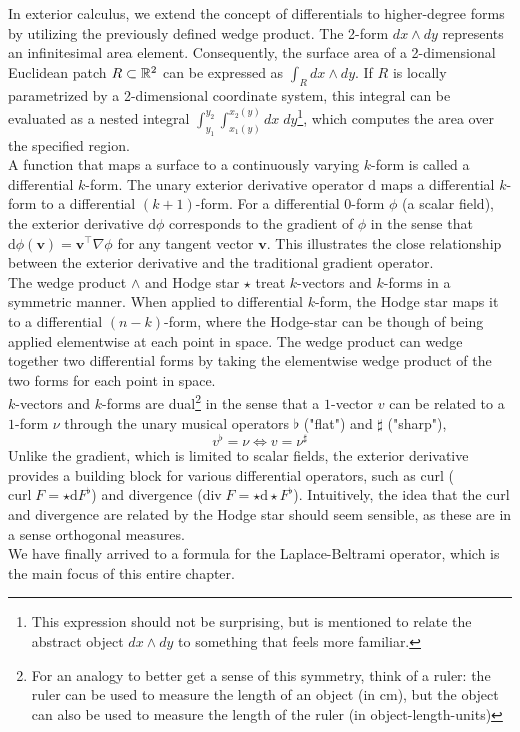 In exterior calculus, we extend the concept of differentials to higher-degree forms by utilizing the previously defined wedge product. The 2-form $dx \wedge dy$ represents an infinitesimal area element. Consequently, the surface area of a 2-dimensional Euclidean patch $R \subset \mathbb{R}^2$ can be expressed as $\int_{R} dx \wedge dy$. If $R$ is locally parametrized by a 2-dimensional coordinate system, this integral can be evaluated as a nested integral $\int_{y_1}^{y_2}\int_{x_1(y)}^{x_2(y)} dx \; dy$\footnote{This expression should not be surprising, but is mentioned to relate the abstract object $dx \wedge dy$ to something that feels more familiar.}, which computes the area over the specified region.
\\
A function that maps a surface to a continuously varying $k$-form is called a differential $k$-form. The unary exterior derivative operator $\text{d}$ maps a differential $k$-form to a differential $(k+1)$-form. For a differential $0$-form $\phi$ (a scalar field), the exterior derivative $\text{d}\phi$ corresponds to the gradient of $\phi$ in the sense that 
$\text{d}\phi(\mathbf{v}) = \mathbf{v} ^\top \nabla \phi$ for any tangent vector $\mathbf{v}$. This illustrates the close relationship between the exterior derivative and the traditional gradient operator. 
\\
The wedge product $\wedge$ and Hodge star $\star$ treat $k$-vectors and $k$-forms in a symmetric manner. When applied to differential $k$-form, the Hodge star maps it to a differential $(n-k)$-form, where the Hodge-star can be though of being applied elementwise at each point in space. The wedge product can wedge together two differential forms by taking the elementwise wedge product of the two forms for each point in space.
\\
$k$-vectors and $k$-forms are dual\footnote{For an analogy to better get a sense of this symmetry, think of a ruler: the ruler can be used to measure the length of an object (in $\text{cm}$), but the object can also be used to measure the length of the ruler (in object-length-units)} in the sense that a $1$-vector $v$ can be related to a $1$-form $\nu$ through the unary musical operators $\flat$ ("flat") and $\sharp$ ("sharp"), $$v^\flat = \nu \iff v = \nu^\sharp$$
Unlike the gradient, which is limited to scalar fields, the exterior derivative provides a building block for various differential operators, such as curl ($\text{curl}\;F =\star \text{d}F^\flat$) and divergence ($\text{div}\;F =\star \text{d}\star F^\flat$). Intuitively, the idea that the curl and divergence are related by the Hodge star should seem sensible, as these are in a sense orthogonal measures. \\ We have finally arrived to a formula for the Laplace-Beltrami operator, which is the main focus of this entire chapter. 
